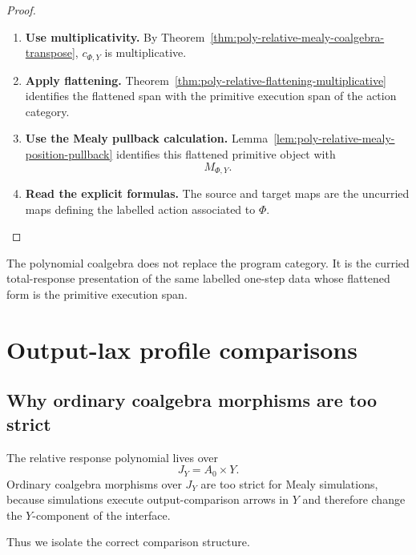 \begin{proof}
\leavevmode
\begin{enumerate}
\item \textbf{Use multiplicativity.}
By Theorem~\ref{thm:poly-relative-mealy-coalgebra-transpose},
\(c_{\Phi,Y}\) is multiplicative.

\item \textbf{Apply flattening.}
Theorem~\ref{thm:poly-relative-flattening-multiplicative} identifies the
flattened span with the primitive execution span of the action category.

\item \textbf{Use the Mealy pullback calculation.}
Lemma~\ref{lem:poly-relative-mealy-position-pullback} identifies this flattened
primitive object with
\[
M_{\Phi,Y}.
\]

\item \textbf{Read the explicit formulas.}
The source and target maps are the uncurried maps defining the labelled action
associated to \(\Phi\).
\end{enumerate}
\end{proof}

\begin{remark}
\label{rem:poly-relative-polynomial-not-replacement}
The polynomial coalgebra does not replace the program category.  It is the
curried total-response presentation of the same labelled one-step data whose
flattened form is the primitive execution span.
\end{remark}

\section{Output-lax profile comparisons}
\label{sec:poly-relative-output-lax-profile-comparisons}

\subsection{Why ordinary coalgebra morphisms are too strict}
\label{subsec:poly-relative-ordinary-morphisms-too-strict}

The relative response polynomial lives over
\[
J_Y=A_0\times Y.
\]
Ordinary coalgebra morphisms over \(J_Y\) are too strict for Mealy simulations,
because simulations execute output-comparison arrows in \(Y\) and therefore
change the \(Y\)-component of the interface.

Thus we isolate the correct comparison structure.

